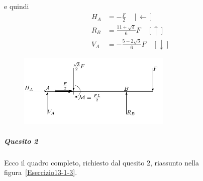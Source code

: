 e quindi 
\begin{align*}
H_{A} &=  - \frac{F}{2} \quad [\leftarrow] \\ 
R_{B} &= \frac{11 + \sqrt{3}}{6} F \quad [\uparrow] \\
V_{A} &= - \frac{5 - 2\sqrt{3}}{6} F \quad [\downarrow]
\end{align*}
\renewcommand{\thefigure}{13.1~-~2}
\begin{figure}[ht]
\centering
\includegraphics[width=0.65\textwidth]{Immagini/Parte_13/Esercizio13_1/figura13_1_2.pdf}
\caption{}
\label{Esercizio13-1-2}
\end{figure}
\subparagraph{Quesito 2}
Ecco il quadro completo, richiesto dal quesito $2$, riassunto nella figura~\ref{Esercizio13-1-3}.
\renewcommand{\thefigure}{13.1~-~3}
